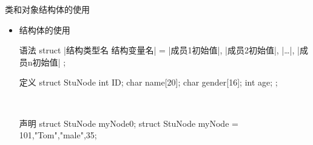 \begin{frame}[fragile]{类和对象}{结构体的使用}%
  \begin{spacing}{1.5}
  \begin{itemize}
  \item 结构体的使用\\[4ex]
    \begin{center}
      \begin{minipage}{0.55\linewidth}
        \begin{cpptcb}[||]{语法}
struct |结构类型名 结构变量名| = {
  |成员1初始值|,
  |成员2初始值|,
  |\ldots|,
  |成员n初始值|
};
        \end{cpptcb}
      \end{minipage}\qquad
      \begin{minipage}{0.35\linewidth}
        \begin{cpptcb}{定义}
struct StuNode{
  int ID;
  char name[20];
  char gender[16];
  int age;
};
        \end{cpptcb}
      \end{minipage}\\
      \vspace{4ex}
      \begin{minipage}{0.85\linewidth}
        \begin{cpptcb}{声明}
struct StuNode myNode0;
struct StuNode myNode = {101,"Tom","male",35};
        \end{cpptcb}
      \end{minipage}
    \end{center}
  \end{itemize}
  \end{spacing}
\end{frame}

